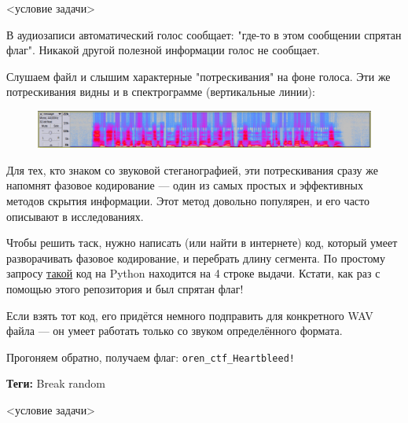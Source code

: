 \documentclass[idxtotoc,hyperref,openany,oneside]{files/forensics} %
\begin{document}
\begin{tcolorbox}
<условие задачи>
\end{tcolorbox}

В аудиозаписи автоматический голос сообщает: "где-то в этом сообщении спрятан флаг". Никакой другой полезной информации голос не сообщает.

Слушаем файл и слышим характерные "потрескивания" на фоне голоса. Эти же потрескивания видны и в спектрограмме (вертикальные линии):
\begin{figure}[H]
\begin{center}
\includegraphics[width=1.0\linewidth]{files/spectrogram}
\end{center}
\label{fig:spectrogram}
\end{figure}

Для тех, кто знаком со звуковой стеганографией, эти потрескивания сразу же напомнят фазовое кодирование — один из самых простых и эффективных методов скрытия информации. Этот метод довольно популярен, и его часто описывают в исследованиях.

Чтобы решить таск, нужно написать (или найти в интернете) код, который умеет разворачивать фазовое кодирование, и перебрать длину сегмента. По простому запросу \href{https://github.com/Galarius/py-stego-phase}{такой} код на Python находится на 4 строке выдачи. Кстати, как раз с помощью этого репозитория и был спрятан флаг!

Если взять тот код, его придётся немного подправить для конкретного WAV файла — он умеет работать только со звуком определённого формата.

Прогоняем обратно, получаем флаг: \verb|oren_ctf_Heartbleed!|




\textbf{Теги:} Break random\vspace{\baselineskip}

\begin{tcolorbox}
<условие задачи>
\end{tcolorbox}
\end{document}
